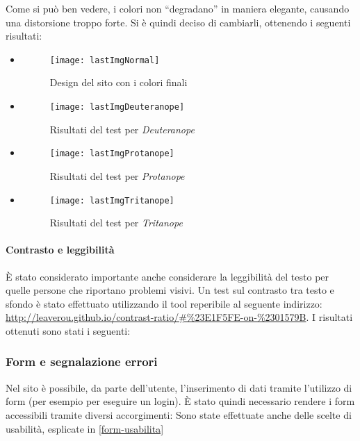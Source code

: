 Come si può ben vedere, i colori non ``degradano'' in maniera elegante, causando una distorsione troppo forte. Si è quindi deciso di cambiarli, ottenendo i seguenti risultati:
\begin{itemize}


    \item[]
       \begin{figure}[H]

            \centering
            \texttt{[image: lastImgNormal]}
            \caption{Design del sito con i colori finali}
        \end{figure}

    \item[]
        \begin{figure}[H]

            \centering
            \texttt{[image: lastImgDeuteranope]}
            \caption{Risultati del test per \textit{Deuteranope}}
        \end{figure}

    \item[]
        \begin{figure}[H]

            \centering
            \texttt{[image: lastImgProtanope]}
            \caption{Risultati del test per \textit{Protanope}}
        \end{figure}

    \item[]
        \begin{figure}[H]

            \centering
            \texttt{[image: lastImgTritanope]}
            \caption{Risultati del test per \textit{Tritanope}}
        \end{figure}

\end{itemize}

\paragraph*{Contrasto e leggibilit\`a}
\`E stato considerato importante anche considerare la leggibilit\`a del testo per quelle persone che riportano problemi visivi. Un test sul contrasto tra testo e sfondo \`e stato effettuato utilizzando il tool reperibile al seguente indirizzo: \url{http://leaverou.github.io/contrast-ratio/#\%23E1F5FE-on-\%2301579B}.
I risultati ottenuti sono stati i seguenti: %

\subsubsection{Form e segnalazione errori}
\label{form-accessibilita}
Nel sito è possibile, da parte dell'utente, l'inserimento di dati tramite l'utilizzo di form (per esempio per eseguire un login). È stato quindi necessario rendere i form accessibili tramite diversi accorgimenti: %
Sono state effettuate anche delle scelte di usabilità, esplicate in \ref{form-usabilita}
